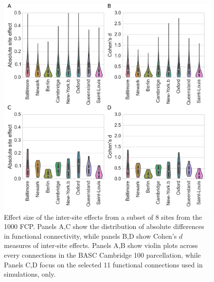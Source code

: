 \documentclass[authoryear]{elsarticle}
\begin{document}

\begin{figure}[htbp]
\begin{center}
\includegraphics[width=0.8\linewidth]{../figures/effect_distribution.png}
\end{center}
\caption[inter site variability]{
Effect size of the inter-site effects from a subset of 8 sites from the 1000 FCP. Panels A,C show the distribution of absolute differences in functional connectivity, while panels B,D show Cohen's $d$ measures of inter-site effects. Panels A,B show violin plots across every connections in the BASC Cambridge 100 parcellation, while Panels C,D focus on the selected 11 functional connections used in simulations, only. 
}
\label{fig_site_variability}
\end{figure}
\end{document}
